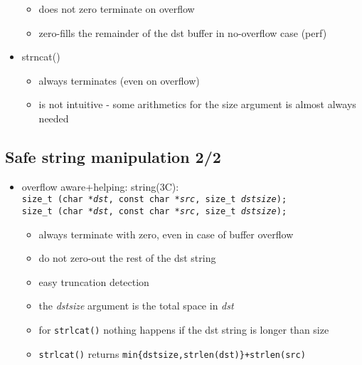 \begin{itemize}
  \begin{itemize}
    \item does not zero terminate on overflow
    \item zero-fills the remainder of the dst buffer in no-overflow case (perf)
  \end{itemize}
  \item strncat()
  \begin{itemize}
    \item always terminates (even on overflow)
    \item is not intuitive - some arithmetics for the size argument is almost
      always needed
  \end{itemize}
\end{itemize}



\subsection{Safe string manipulation 2/2}

\begin{itemize}
  \item overflow aware+helping: string(3C): \\
    \texttt{size\_t (char *\emph{dst}, const char
    *\emph{src}, size\_t \emph{dstsize});} \\
    \texttt{size\_t (char *\emph{dst}, const char
    *\emph{src}, size\_t \emph{dstsize});}
  \begin{itemize}
    \item always terminate with zero, even in case of buffer overflow
    \item do not zero-out the rest of the dst string
    \item easy truncation detection
    \item the \emph{dstsize} argument is the total space in \emph{dst}
    \item for \texttt{strlcat()} nothing happens if the dst string is longer
      than size
    \item \texttt{strlcat()} returns
      \texttt{min\{dstsize,strlen(dst)\}+strlen(src)}
  \end{itemize}
\end{itemize}


